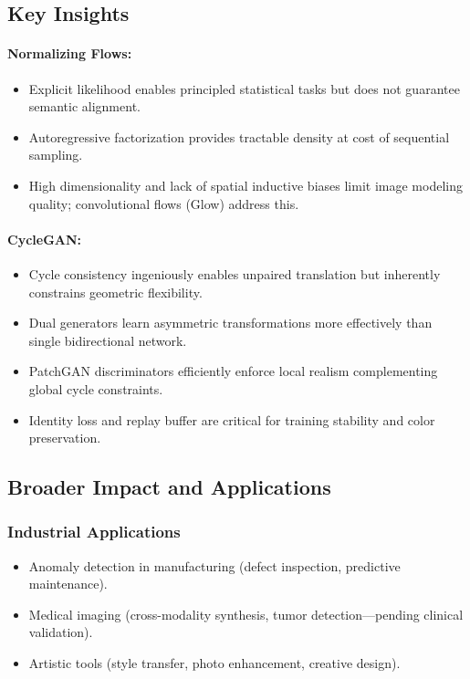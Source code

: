 \documentclass[conference]{IEEEtran}
\begin{document}
\subsection{Key Insights}
\paragraph{Normalizing Flows:}
\begin{itemize}
\item Explicit likelihood enables principled statistical tasks but does not guarantee semantic alignment.
\item Autoregressive factorization provides tractable density at cost of sequential sampling.
\item High dimensionality and lack of spatial inductive biases limit image modeling quality; convolutional flows (Glow) address this.
\end{itemize}

\paragraph{CycleGAN:}
\begin{itemize}
\item Cycle consistency ingeniously enables unpaired translation but inherently constrains geometric flexibility.
\item Dual generators learn asymmetric transformations more effectively than single bidirectional network.
\item PatchGAN discriminators efficiently enforce local realism complementing global cycle constraints.
\item Identity loss and replay buffer are critical for training stability and color preservation.
\end{itemize}

\subsection{Broader Impact and Applications}
\subsubsection{Industrial Applications}
\begin{itemize}
\item Anomaly detection in manufacturing (defect inspection, predictive maintenance).
\item Medical imaging (cross-modality synthesis, tumor detection—pending clinical validation).
\item Artistic tools (style transfer, photo enhancement, creative design).
\end{itemize}
\end{document}

